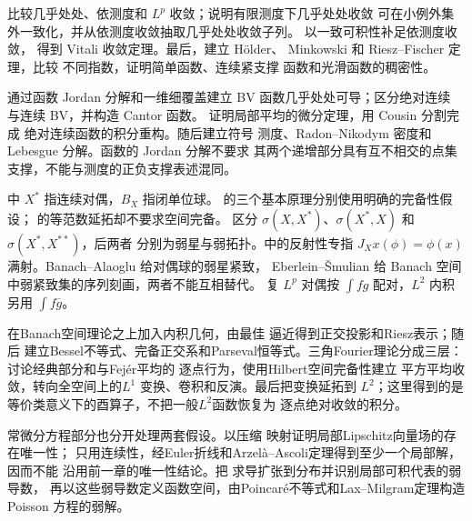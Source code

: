 比较几乎处处、依测度和 \(L^p\)
收敛；说明有限测度下几乎处处收敛
可在小例外集外一致化，并从依测度收敛抽取几乎处处收敛子列。
以一致可积性补足依测度收敛，
得到 Vitali 收敛定理。最后，建立 Hölder、
Minkowski 和 Riesz--Fischer 定理，比较
不同指数，证明简单函数、连续紧支撑
函数和光滑函数的稠密性。

通过函数 Jordan 分解和一维细覆盖建立
BV 函数几乎处处可导；区分绝对连续
与连续 BV，并构造 Cantor 函数。
证明局部平均的微分定理，用 Cousin 分割完成
绝对连续函数的积分重构。随后建立符号
测度、Radon--Nikodym 密度和 Lebesgue 分解。函数的 Jordan 分解不要求
其两个递增部分具有互不相交的点集支撑，不能与测度的正负支撑表述混同。

中 \(X^*\) 指连续对偶，\(B_X\) 指闭单位球。
的三个基本原理分别使用明确的完备性假设；
的等范数延拓却不要求空间完备。
区分
\(\sigma(X,X^*)\)、\(\sigma(X^*,X)\) 和 \(\sigma(X^*,X^{**})\)，后两者
分别为弱星与弱拓扑。中的反射性专指
\(J_Xx(\phi)=\phi(x)\) 满射。Banach--Alaoglu 给对偶球的弱星紧致，
Eberlein--Šmulian 给 Banach 空间中弱紧致集的序列刻画，两者不能互相替代。
复 \(L^p\) 对偶按 \(\int fg\) 配对，\(L^2\) 内积另用 \(\int f\overline g\)。

在Banach空间理论之上加入内积几何，由最佳
逼近得到正交投影和Riesz表示；随后
建立Bessel不等式、完备正交系和Parseval恒等式。三角Fourier理论分成三层：
讨论经典部分和与Fejér平均的
逐点行为，使用Hilbert空间完备性建立
平方平均收敛，转向全空间上的\(L^1\)
变换、卷积和反演。最后把变换延拓到
\(L^2\)；这里得到的是等价类意义下的酉算子，不把一般\(L^2\)函数恢复为
逐点绝对收敛的积分。

常微分方程部分也分开处理两套假设。以压缩
映射证明局部Lipschitz向量场的存在唯一性；
只用连续性，经Euler折线和Arzelà--Ascoli定理得到至少一个局部解，因而不能
沿用前一章的唯一性结论。把
求导扩张到分布并识别局部可积代表的弱导数，
再以这些弱导数定义函数空间，由Poincaré不等式和Lax--Milgram定理构造Poisson
方程的弱解。

